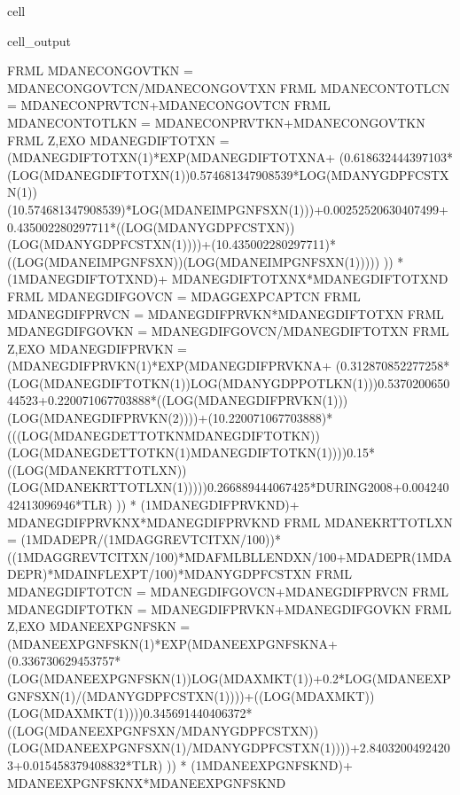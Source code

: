 \documentclass[letterpaper,10pt,english]{jupyterBook}
\begin{document}
\begin{sphinxuseclass}{cell}
\begin{sphinxVerbatimOutput}
\begin{sphinxuseclass}{cell_output}
\begin{sphinxVerbatim}[commandchars=\\\{\}]
FRML  \PYGZlt{}\PYGZgt{} MDANECONGOVTKN = MDANECONGOVTCN/MDANECONGOVTXN \PYGZdl{}
FRML  \PYGZlt{}\PYGZgt{} MDANECONTOTLCN = MDANECONPRVTCN+MDANECONGOVTCN \PYGZdl{}
FRML  \PYGZlt{}\PYGZgt{} MDANECONTOTLKN = MDANECONPRVTKN+MDANECONGOVTKN \PYGZdl{}
FRML \PYGZlt{}Z,EXO\PYGZgt{} MDANEGDIFTOTXN = (MDANEGDIFTOTXN(\PYGZhy{}1)*EXP(MDANEGDIFTOTXN\PYGZus{}A+ (\PYGZhy{}0.618632444397103*(LOG(MDANEGDIFTOTXN(\PYGZhy{}1))\PYGZhy{}0.574681347908539*LOG(MDANYGDPFCSTXN(\PYGZhy{}1))\PYGZhy{}(1\PYGZhy{}0.574681347908539)*LOG(MDANEIMPGNFSXN(\PYGZhy{}1)))+0.00252520630407499+0.435002280297711*((LOG(MDANYGDPFCSTXN))\PYGZhy{}(LOG(MDANYGDPFCSTXN(\PYGZhy{}1))))+(1\PYGZhy{}0.435002280297711)*((LOG(MDANEIMPGNFSXN))\PYGZhy{}(LOG(MDANEIMPGNFSXN(\PYGZhy{}1))))) )) * (1\PYGZhy{}MDANEGDIFTOTXN\PYGZus{}D)+ MDANEGDIFTOTXN\PYGZus{}X*MDANEGDIFTOTXN\PYGZus{}D  \PYGZdl{}
FRML  \PYGZlt{}\PYGZgt{} MDANEGDIFGOVCN = MDAGGEXPCAPTCN \PYGZdl{}
FRML  \PYGZlt{}\PYGZgt{} MDANEGDIFPRVCN = MDANEGDIFPRVKN*MDANEGDIFTOTXN \PYGZdl{}
FRML  \PYGZlt{}\PYGZgt{} MDANEGDIFGOVKN = MDANEGDIFGOVCN/MDANEGDIFTOTXN \PYGZdl{}
FRML \PYGZlt{}Z,EXO\PYGZgt{} MDANEGDIFPRVKN = (MDANEGDIFPRVKN(\PYGZhy{}1)*EXP(MDANEGDIFPRVKN\PYGZus{}A+ (\PYGZhy{}0.312870852277258*(LOG(MDANEGDIFTOTKN(\PYGZhy{}1))\PYGZhy{}LOG(MDANYGDPPOTLKN(\PYGZhy{}1)))\PYGZhy{}0.537020065044523+0.220071067703888*((LOG(MDANEGDIFPRVKN(\PYGZhy{}1)))\PYGZhy{}(LOG(MDANEGDIFPRVKN(\PYGZhy{}2))))+(1\PYGZhy{}0.220071067703888)*(((LOG(MDANEGDETTOTKN\PYGZhy{}MDANEGDIFTOTKN))\PYGZhy{}(LOG(MDANEGDETTOTKN(\PYGZhy{}1)\PYGZhy{}MDANEGDIFTOTKN(\PYGZhy{}1))))\PYGZhy{}0.15*((LOG(MDANEKRTTOTLXN))\PYGZhy{}(LOG(MDANEKRTTOTLXN(\PYGZhy{}1)))))\PYGZhy{}0.266889444067425*DURING\PYGZus{}2008+0.00424042413096946*T\PYGZus{}LR) )) * (1\PYGZhy{}MDANEGDIFPRVKN\PYGZus{}D)+ MDANEGDIFPRVKN\PYGZus{}X*MDANEGDIFPRVKN\PYGZus{}D  \PYGZdl{}
FRML  \PYGZlt{}\PYGZgt{} MDANEKRTTOTLXN = (1\PYGZhy{}MDADEPR/(1\PYGZhy{}MDAGGREVTCITXN/100))*((1\PYGZhy{}MDAGGREVTCITXN/100)*MDAFMLBLLENDXN/100+MDADEPR\PYGZhy{}(1\PYGZhy{}MDADEPR)*MDAINFLEXPT/100)*MDANYGDPFCSTXN \PYGZdl{}
FRML  \PYGZlt{}\PYGZgt{} MDANEGDIFTOTCN = MDANEGDIFGOVCN+MDANEGDIFPRVCN \PYGZdl{}
FRML  \PYGZlt{}\PYGZgt{} MDANEGDIFTOTKN = MDANEGDIFPRVKN+MDANEGDIFGOVKN \PYGZdl{}
FRML \PYGZlt{}Z,EXO\PYGZgt{} MDANEEXPGNFSKN = (MDANEEXPGNFSKN(\PYGZhy{}1)*EXP(MDANEEXPGNFSKN\PYGZus{}A+ (\PYGZhy{}0.336730629453757*(LOG(MDANEEXPGNFSKN(\PYGZhy{}1))\PYGZhy{}LOG(MDAXMKT(\PYGZhy{}1))+0.2*LOG(MDANEEXPGNFSXN(\PYGZhy{}1)/(MDANYGDPFCSTXN(\PYGZhy{}1))))+((LOG(MDAXMKT))\PYGZhy{}(LOG(MDAXMKT(\PYGZhy{}1))))\PYGZhy{}0.345691440406372*((LOG(MDANEEXPGNFSXN/MDANYGDPFCSTXN))\PYGZhy{}(LOG(MDANEEXPGNFSXN(\PYGZhy{}1)/MDANYGDPFCSTXN(\PYGZhy{}1))))+2.84032004924203+0.015458379408832*T\PYGZus{}LR) )) * (1\PYGZhy{}MDANEEXPGNFSKN\PYGZus{}D)+ MDANEEXPGNFSKN\PYGZus{}X*MDANEEXPGNFSKN\PYGZus{}D  \PYGZdl{}

\end{sphinxVerbatim}
\end{sphinxuseclass}
\end{sphinxVerbatimOutput}
\end{sphinxuseclass}
\end{document}
